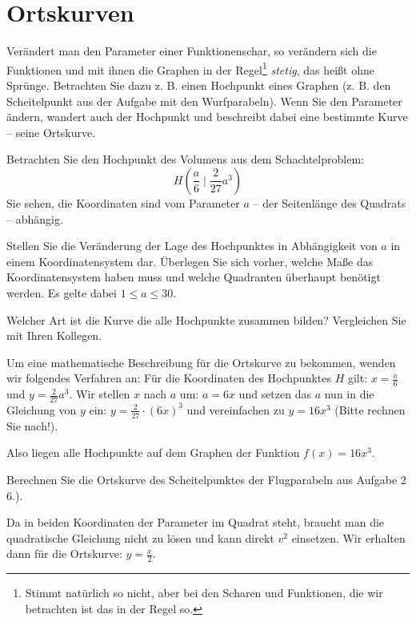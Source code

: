 \documentclass[12pt,a4paper,twoside,fleqn]{article}
\begin{document}
\section{Ortskurven}
Verändert man den Parameter einer Funktionenschar, so verändern sich
die Funktionen und mit ihnen die Graphen in der Regel\footnote{Stimmt
  natürlich so nicht, aber bei den Scharen und Funktionen, die wir
  betrachten ist das in der Regel so.}  \emph{stetig}, das
heißt ohne Sprünge. Betrachten Sie dazu z. B. einen Hochpunkt eines
Graphen (z. B. den Scheitelpunkt aus der Aufgabe mit den
Wurfparabeln). Wenn Sie den Parameter ändern, wandert auch der
Hochpunkt und beschreibt dabei eine bestimmte Kurve -- seine
Ortskurve.

Betrachten Sie den Hochpunkt des Volumens aus dem Schachtelproblem:
$$H\left(\frac a 6\mid\frac 2 {27}a^3\right)$$ %
Sie sehen, die Koordinaten sind vom Parameter $a$ -- der Seitenlänge
des Quadrats -- abhängig.

Stellen Sie die Veränderung der Lage des Hochpunktes in Abhängigkeit
von $a$ in einem Koordinatensystem dar. Überlegen Sie sich vorher,
welche Maße das Koordinatensystem haben muss und welche Quadranten
überhaupt benötigt werden. Es gelte dabei $1\leq a\leq 30$. 

Welcher Art ist die Kurve die alle Hochpunkte zusammen bilden?
Vergleichen Sie mit Ihren Kollegen.

Um eine mathematische Beschreibung für die Ortskurve zu bekommen,
wenden wir folgendes Verfahren an: 
Für die Koordinaten des Hochpunktes $H$ gilt: $x= \frac a 6$ und
$y=\frac 2 {27}a^3$. Wir stellen $x$ nach $a$ um: $a=6x$ und setzen
das $a$ nun in die Gleichung von $y$ ein: $y=\frac 2 {27}\cdot (6x)^3$
und vereinfachen zu $y=16x^3$ (Bitte rechnen Sie nach!).

Also liegen alle Hochpunkte auf dem Graphen der Funktion $f(x)=16x^3$.

\begin{question}

  Berechnen Sie die Ortskurve des Scheitelpunktes der Flugparabeln aus Aufgabe 2 6.).
\end{question}
\begin{solution}
  Da in beiden Koordinaten der Parameter im Quadrat steht, braucht man die quadratische Gleichung nicht zu lösen und kann direkt $v^2$ einsetzen. Wir erhalten dann für die Ortskurve: $y=\frac x 2$.
\end{solution}
\end{document}
